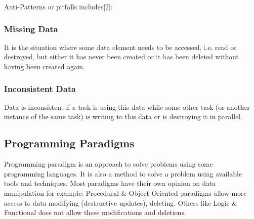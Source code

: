 \documentclass[12pt,twoside]{article}
\begin{document}
Anti-Patterns or pitfalls includes[2]:

\subsubsection{Missing Data}
It is the situation where some data element needs to be accessed, i.e. read or destroyed, but either it has never been created or it has been deleted without having been created again.
\subsubsection{Inconsistent Data} 
Data is inconsistent if a task is using this data while some other task (or another instance of the same task) is writing to this data or is destroying it in parallel.
\subsection{Programming Paradigms}
Programming paradigm is an approach to solve problems using some programming languages. It is also a method to solve a problem using available tools and techniques.
Most paradigms have their own opinion on data manipulation for example: Procedural \& Object Oriented paradigms allow more access to data modifying (destructive updates), deleting. Others like Logic \& Functional does not allow these modifications and deletions.
\end{document}
